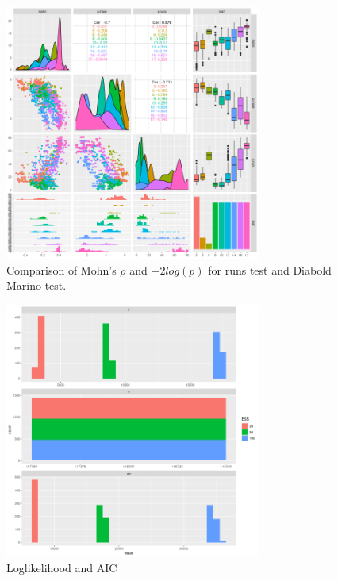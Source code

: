 \begin{figure}[ht!]\centering\includegraphics[width=0.75\textwidth]{figures/cluster.tree-1.png} \caption{Comparison of Mohn's $\rho$ and $-2log(p)$ for runs test and Diabold Marino test.}\label{fig:xxx} \end{figure}

\begin{figure}[ht!]\centering\includegraphics[width=0.75\textwidth]{figures/aic-1.png} \caption{Loglikelihood and AIC}\label{fig:aic} \end{figure}

